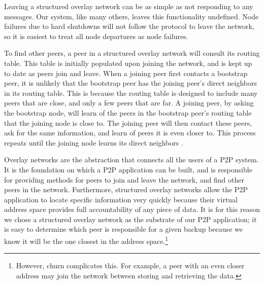 \documentclass[12pt]{report}
\begin{document}
Leaving a structured overlay network can be as simple as not responding to any messages. Our system, like many others, leaves this functionality undefined. Node failures due to hard shutdowns will not follow the protocol to leave the network, so it is easiest to treat all node departures as node failures.

To find other peers, a peer in a structured overlay network will consult its routing table. This table is initially populated upon joining the network, and is kept up to date as peers join and leave. When a joining peer first contacts a bootstrap peer, it is unlikely that the bootstrap peer has the joining peer's direct neighbors in its routing table. This is because the routing table is designed to include many peers that are close, and only a few peers that are far. A joining peer, by asking the bootstrap node, will learn of the peers in the bootstrap peer's routing table that the joining node is close to. The joining peer will then contact these peers, ask for the same information, and learn of peers it is even closer to. This process repeats until the joining node learns its direct neighbors \cite{p2pSurvey}.

Overlay networks are the abstraction that connects all the users of a P2P system. It is the foundation on which a P2P application can be built, and is responsible for providing methods for peers to join and leave the network, and find other peers in the network. Furthermore, structured overlay networks allow the P2P application to locate specific information very quickly because their virtual address space provides full accountability of any piece of data. It is for this reason we chose a structured overlay network as the substrate of our P2P application; it is easy to determine which peer is responsible for a given backup because we know it will be the one closest in the address space.\footnote{However, churn complicates this. For example, a peer with an even closer address may join the network between storing and retrieving the data.}


\end{document}
